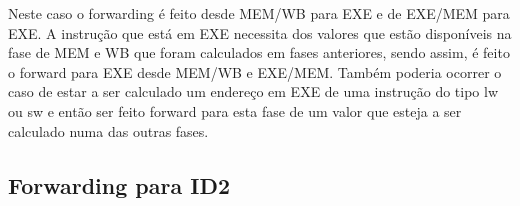 \documentclass[pdftex,12pt,a4paper]{report}
\begin{document}
\begin{table}[!htb]
\centering
\label{my-label}
\end{table}

Neste caso o forwarding é feito desde MEM/WB para EXE e de EXE/MEM para EXE. A instrução que está em EXE necessita dos valores que estão disponíveis na fase de MEM e WB que foram calculados em fases anteriores, sendo assim, é feito o forward para EXE desde MEM/WB e EXE/MEM. Também poderia ocorrer o caso de estar a ser calculado um endereço em EXE de uma instrução do tipo lw ou sw e então ser feito forward para esta fase de um valor que esteja a ser calculado numa das outras fases.

\subsection{Forwarding para ID2}
\end{document}
